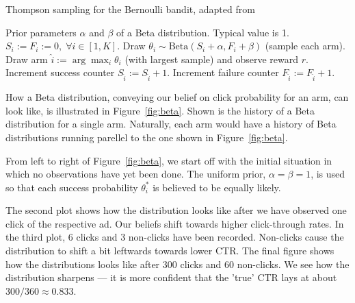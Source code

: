 \documentclass{article} %
\begin{document}
\begin{algorithm}[H]
  \caption{Thompson sampling for the Bernoulli bandit, adapted from \cite{chapelle2011empirical}}
  \label{alg:thompson-bandit}
  \begin{algorithmic}[1]
    \Require Prior parameters $\alpha$ and $\beta$ of a Beta distribution.
    Typical value is 1.
    \State $S_i := F_i := 0, \; \forall i \in [1,K]$.
      \State Draw $\theta_i \sim \text{Beta}(S_i + \alpha, F_i + \beta)$
      (sample each arm).
      \EndFor
      \State Draw arm $\hat{i} := \arg\max_{i} \theta_i$ (with largest sample) and observe reward $r$.
      \State Increment success counter $S_{\hat{i}} := S_{\hat{i}} + 1$.
      \Else
        \State Increment failure counter $F_{\hat{i}} := F_{\hat{i}} + 1$.
      \EndIf
    \EndFor
  \end{algorithmic}
\end{algorithm}

How a Beta distribution, conveying our belief on click probability for an arm,
can look like, is illustrated in Figure~\ref{fig:beta}. Shown is the history of
a Beta distribution for a single arm. Naturally, each arm would have a history
of Beta distributions running parellel to the one shown in
Figure~\ref{fig:beta}.

From left to right of Figure~\ref{fig:beta}, we start off with the initial
situation in which no observations have yet been done. The uniform prior,
$\alpha = \beta = 1$, is used so that each success probability $\theta^*_i$ is
believed to be equally likely.

The second plot shows how the distribution looks like after we have observed
one click of the respective ad. Our beliefs shift towards higher click-through
rates. In the third plot, 6 clicks and 3 non-clicks have been recorded.
Non-clicks cause the distribution to shift a bit leftwards towards lower CTR.
The final figure shows how the distributions looks like after 300 clicks and 60
non-clicks. We see how the distribution sharpens --- it is more confident that
the 'true' CTR lays at about $300 / 360 \approx 0.833$.
\end{document}
